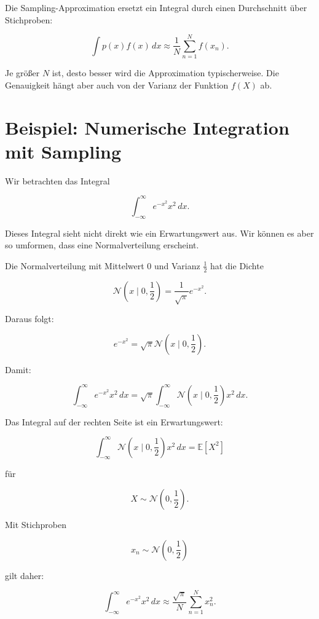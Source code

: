 \begin{conceptbox}
Die Sampling-Approximation ersetzt ein Integral durch einen Durchschnitt über Stichproben:

\[
    \int p(x)f(x)\,dx
    \approx
    \frac{1}{N}
    \sum_{n=1}^{N} f(x_n).
\]
\end{conceptbox}

Je größer \(N\) ist, desto besser wird die Approximation typischerweise.
Die Genauigkeit hängt aber auch von der Varianz der Funktion \(f(X)\) ab.

\section{Beispiel: Numerische Integration mit Sampling}

Wir betrachten das Integral

\[
    \int_{-\infty}^{\infty}
    e^{-x^2}x^2\,dx.
\]

Dieses Integral sieht nicht direkt wie ein Erwartungswert aus.
Wir können es aber so umformen, dass eine Normalverteilung erscheint.

Die Normalverteilung mit Mittelwert \(0\) und Varianz \(\frac{1}{2}\) hat die Dichte

\[
    \mathcal{N}\left(x \mid 0,\frac{1}{2}\right)
    =
    \frac{1}{\sqrt{\pi}}
    e^{-x^2}.
\]

Daraus folgt:

\[
    e^{-x^2}
    =
    \sqrt{\pi}
    \mathcal{N}\left(x \mid 0,\frac{1}{2}\right).
\]

Damit:

\[
    \int_{-\infty}^{\infty}
    e^{-x^2}x^2\,dx
    =
    \sqrt{\pi}
    \int_{-\infty}^{\infty}
    \mathcal{N}\left(x \mid 0,\frac{1}{2}\right)
    x^2\,dx.
\]

Das Integral auf der rechten Seite ist ein Erwartungswert:

\[
    \int_{-\infty}^{\infty}
    \mathcal{N}\left(x \mid 0,\frac{1}{2}\right)
    x^2\,dx
    =
    \mathbb{E}[X^2]
\]

für

\[
    X \sim \mathcal{N}\left(0,\frac{1}{2}\right).
\]

Mit Stichproben

\[
    x_n \sim \mathcal{N}\left(0,\frac{1}{2}\right)
\]

gilt daher:

\[
    \int_{-\infty}^{\infty}
    e^{-x^2}x^2\,dx
    \approx
    \frac{\sqrt{\pi}}{N}
    \sum_{n=1}^{N}
    x_n^2.
\]

